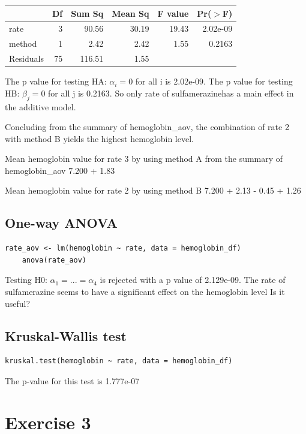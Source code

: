 \documentclass{article}
\begin{document}
\begin{table}[ht]
\centering
\begin{tabular}{lrrrrr}
  \hline
 & Df & Sum Sq & Mean Sq & F value & Pr($>$F) \\ 
  \hline
rate & 3 & 90.56 & 30.19 & 19.43 & 2.02e-09 \\ 
  method & 1 & 2.42 & 2.42 & 1.55 & 0.2163 \\ 
  Residuals & 75 & 116.51 & 1.55 &  &  \\ 
   \hline
\end{tabular}
\end{table}

The p value for testing HA: $\alpha_i = 0$ for all i is 2.02e-09.
The p value for testing HB: $\beta_j = 0$ for all j is 0.2163.
So only rate of sulfamerazinehas a main effect in the additive model.

Concluding from the summary of hemoglobin\_aov, the combination of rate 2 with method B yields the highest hemoglobin level.

Mean hemoglobin value for rate 3 by using method A from the summary of hemoglobin\_aov 7.200 + 1.83

Mean hemoglobin value for rate 2 by using method B 7.200 + 2.13 - 0.45 + 1.26

\subsection{One-way ANOVA}
\begin{lstlisting}[caption="One-Way ANOVA", label={lst:owa}]
    rate_aov <- lm(hemoglobin ~ rate, data = hemoglobin_df)
    anova(rate_aov)
\end{lstlisting}
Testing H0: $\alpha_1=...=\alpha_4$ is rejected with a p value of 2.129e-09.
The rate of sulfamerazine seems to have a significant effect on the hemoglobin level
Is it useful?

\subsection{Kruskal-Wallis test}
\begin{lstlisting}[caption="Kruskal-Wallis", label={lst:kw}]
    kruskal.test(hemoglobin ~ rate, data = hemoglobin_df)
\end{lstlisting}
The p-value for this test is 1.777e-07


\section{Exercise 3}
\end{document}
